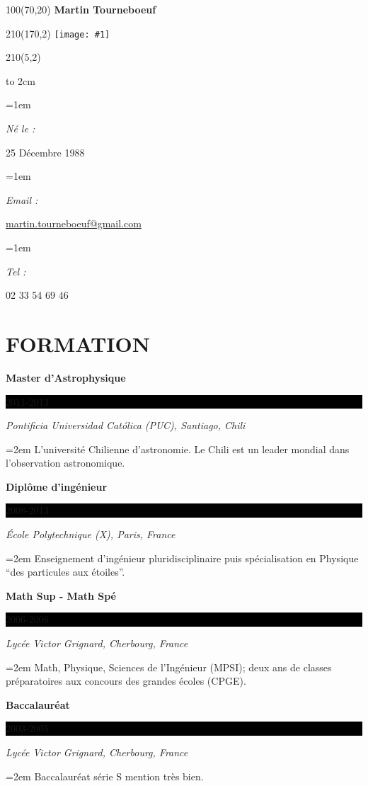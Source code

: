 \documentclass[paper=a4, fontsize=11pt, french]{scrartcl}	 			%
\newlength{\spacebox}
\newcommand{\sepspace}{\vspace*{1em}}			%
\newcommand{\MyName}[1]{
   \begin{textblock}{100}(70,20)
	   \centering\huge\bfseries {#1}
   \end{textblock}  
   }
\newcommand{\MyFoto}[1]{ %
	\begin{textblock}{210}(170,2)
		\texttt{[image: \#1]}
	\end{textblock}  
	}
\newcommand{\MyData}[1]{ %
    \begin{textblock}{210}(5,2)
      { \vbox to 2cm { \vfill  { \flushleft  #1 }  }  }
    \end{textblock}  
    }
\newcommand{\NewPart}[1]{\section*{\uppercase{#1}}}
\newcommand{\PersonalEntry}[2]{
		\noindent\hangindent=1em\hangafter=0 		%
		\parbox{\spacebox}{						%
		   \textit{#1}}								%
		 #2 \par}					%
\newcommand{\EducationEntry}[4]{
		\noindent \textbf{#1} \hfill 					%
		\colorbox{Black}{%
			\parbox{4.5em}{%
			\hfill\color{White}#2}} \par				%
		\noindent \textit{#3} \par					%
		\noindent\hangindent=2em\hangafter=0 \small #4 	%
		\normalsize \par}
\begin{document}




\MyName{Martin Tourneboeuf}

\MyFoto{../Figure/martin2015.jpg}


\MyData
{
\PersonalEntry{Né le :}   {25 Décembre 1988} 
\PersonalEntry{Email :}{\url{martin.tourneboeuf@gmail.com}}
\PersonalEntry{Tel :}  {02 33 54 69 46} 
}





% 
%    
    

  
  
  


\NewPart{Formation}{} 



\EducationEntry{Master d'Astrophysique}{2011-2013}{Pontificia Universidad Cat\'olica (PUC), Santiago, Chili}
    { L'université Chilienne d'astronomie. 
    Le Chili est un leader mondial dans l'observation astronomique. }

\EducationEntry{Diplôme d'ingénieur}{2008-2013}{\'Ecole Polytechnique (X), Paris, France}
    {Enseignement d'ingénieur pluridisciplinaire puis spécialisation en Physique 
    ``des particules aux étoiles''.}



\EducationEntry{Math Sup - Math Spé}{2006-2008}{Lyc\'ee Victor Grignard, Cherbourg, France}
{Math, Physique, Sciences de l'Ingénieur (MPSI);
 deux ans de classes préparatoires aux concours des grandes écoles (CPGE).
}


\EducationEntry{Baccalaur\'eat}{2003-2005}{Lyc\'ee Victor Grignard, Cherbourg, France}
{Baccalauréat série S mention très bien. 
}
\end{document}
